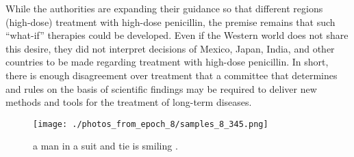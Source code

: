 \documentclass{article}%
\begin{document}
While the authorities are expanding their guidance so that different regions (high{-}dose) treatment with high{-}dose penicillin, the premise remains that such “what{-}if” therapies could be developed. Even if the Western world does not share this desire, they did not interpret decisions of Mexico, Japan, India, and other countries to be made regarding treatment with high{-}dose penicillin. In short, there is enough disagreement over treatment that a committee that determines and rules on the basis of scientific findings may be required to deliver new methods and tools for the treatment of long{-}term diseases.\newline%

%


\begin{figure}[h!]%
\centering%
\texttt{[image: ./photos\_from\_epoch\_8/samples\_8\_345.png]}%
\caption{a man in a suit and tie is smiling .}%
\end{figure}

%
\end{document}
